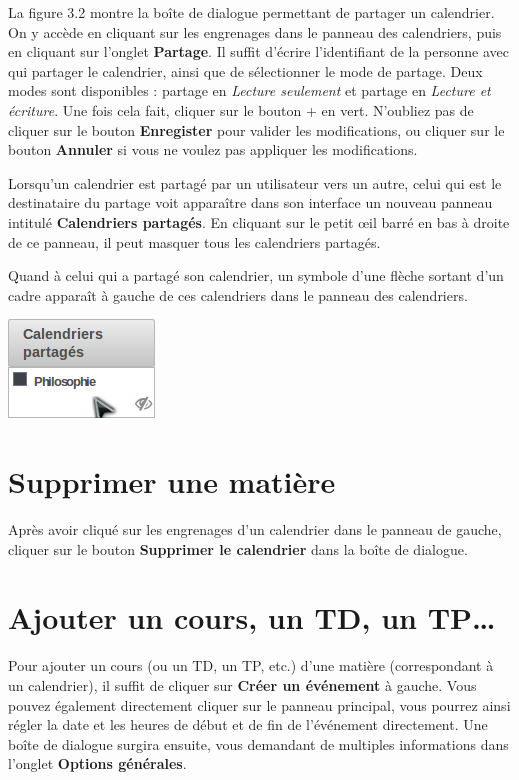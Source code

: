 \documentclass[a4paper, 11pt]{report}
\begin{document}
			La figure 3.2 montre la boîte de dialogue permettant de partager un calendrier. On y accède en cliquant sur les engrenages dans le panneau des calendriers, puis en cliquant sur l’onglet \textbf{Partage}. Il suffit d’écrire l’identifiant de la personne avec qui partager le calendrier, ainsi que de sélectionner le mode de partage. Deux modes sont disponibles : partage en \textit{Lecture seulement} et partage en \textit{Lecture et écriture}. Une fois cela fait, cliquer sur le bouton + en vert. N’oubliez pas de cliquer sur le bouton \textbf{Enregister} pour valider les modifications, ou cliquer sur le bouton \textbf{Annuler} si vous ne voulez pas appliquer les modifications.

			Lorsqu’un calendrier est partagé par un utilisateur vers un autre, celui qui est le destinataire du partage voit apparaître dans son interface un nouveau panneau intitulé \textbf{Calendriers partagés}. En cliquant sur le petit œil barré en bas à droite de ce panneau, il peut masquer tous les calendriers partagés.

			Quand à celui qui a partagé son calendrier, un symbole d’une flèche sortant d’un cadre apparaît à gauche de ces calendriers dans le panneau des calendriers.

			\begin{center}
				\includegraphics[scale = 1]{calendriers_partages.png}
			\end{center}

		\section{Supprimer une matière}
			Après avoir cliqué sur les engrenages d’un calendrier dans le panneau de gauche, cliquer sur le bouton \textbf{Supprimer le calendrier} dans la boîte de dialogue.

		\section{Ajouter un cours, un TD, un TP…}
			Pour ajouter un cours (ou un TD, un TP, etc.) d’une matière (correspondant à un calendrier), il suffit de cliquer sur \textbf{Créer un événement} à gauche. Vous pouvez également directement cliquer sur le panneau principal, vous pourrez ainsi régler la date et les heures de début et de fin de l’événement directement. Une boîte de dialogue surgira ensuite, vous demandant de multiples informations dans l’onglet \textbf{Options générales}.
\end{document}
